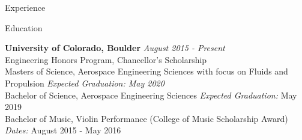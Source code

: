 \documentclass{resume} %
\begin{document}
\begin{rSection}{Experience}


\end{rSection}







\begin{rSection}{Education}

{\bf University of Colorado, Boulder} \hfill {\em August 2015 - Present} \\ 
{\small Engineering Honors Program, Chancellor's Scholarship\\
Masters of Science, Aerospace Engineering Sciences with focus on Fluids and Propulsion \hfill {\textit{Expected Graduation: May 2020}} \\
Bachelor of Science, Aerospace Engineering Sciences \hfill {\textit{Expected Graduation:} May 2019} \\
Bachelor of Music, Violin Performance (College of Music Scholarship Award) \hfill {\textit{Dates:} August 2015 - May 2016} 
} 

\end{rSection}

\end{document}
